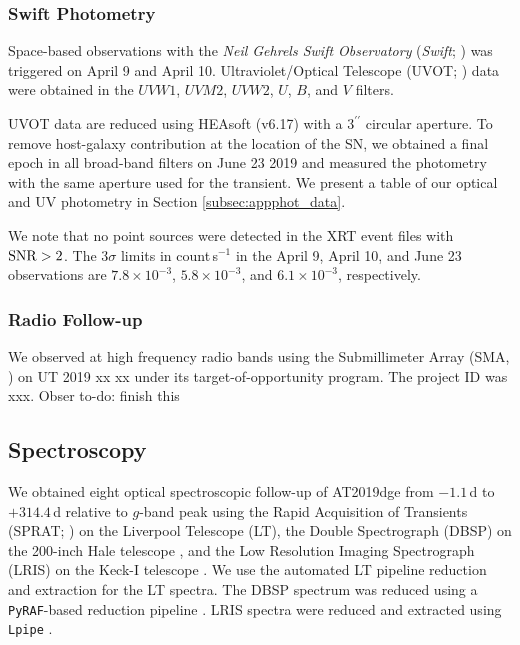 \documentclass[twocolumn]{aastex63}
\newcommand{\todo}[1]{{\color{magenta} to-do: {#1}}}
\begin{document}
\begin{CJK*}{UTF8}{gbsn}
\subsubsection{Swift Photometry}
Space-based observations with the \textit{Neil Gehrels Swift Observatory} (\textit{Swift}; 
\citealt{Gehrels2004}) was triggered on April 9 and April 10. Ultraviolet/Optical Telescope (UVOT; 
\citealt{Roming2005}) data were obtained in the $UVW1$, $UVM2$, $UVW2$, $U$, $B$, and $V$ 
filters. 

UVOT data are reduced using HEAsoft (v6.17) with a $3^{\prime\prime}$ circular aperture. To remove 
host-galaxy contribution at the location of the SN, we obtained a final epoch in all broad-band filters 
on June 23 2019 and measured the photometry with the same aperture used for the transient. We 
present a table of our optical and UV photometry in Section \ref{subsec:appphot_data}.

We note that no point sources were detected in the XRT event files with $\rm{SNR}>2$.
The 3$\sigma$ limits in count\,s$^{-1}$ in the April 9, April 10, and June 23 observations are $7.8\times 
10^{-3}$,  $5.8\times 10^{-3}$, and $6.1\times 10^{-3}$, respectively.

\subsubsection{Radio Follow-up}
We observed at high frequency radio bands using the Submillimeter Array (SMA, \citealt{Ho2004}) on 
UT 2019 xx xx under its target-of-opportunity program. The project ID was xxx. Obser \todo{finish this}


\subsection{Spectroscopy}

We obtained eight optical spectroscopic follow-up of AT2019dge from $-1.1$\,d to $+314.4$\,d relative 
to $g$-band peak using the Rapid Acquisition of Transients (SPRAT; \citealt{Piascik2014}) on the 
Liverpool Telescope (LT), the Double Spectrograph (DBSP) on the 200-inch Hale telescope 
\citep{Oke1982}, and the Low Resolution Imaging Spectrograph (LRIS) on the Keck-I telescope 
\citep{Oke1995}. We use the automated LT pipeline reduction and extraction for the LT spectra. The 
DBSP spectrum was reduced using a \texttt{PyRAF}-based reduction pipeline \citep{Bellm2016}. LRIS 
spectra were reduced and extracted using \texttt{Lpipe} \citep{Perley2019lpipe}. 



\end{CJK*}
\end{document}
